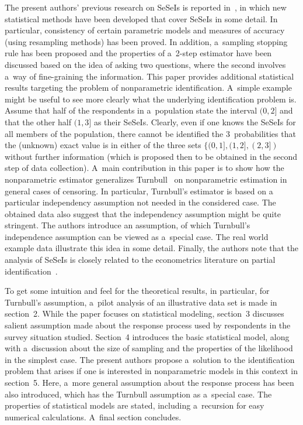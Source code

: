 \begin{multicols}{2}
The present authors' previous research on SeSeIs is reported in~\cite{BK:BK10, BK:BK12},
in which new statistical methods have been developed that cover SeSeIs in some detail. In particular,
consistency of certain parametric models and measures of accuracy (using resampling methods)
has been proved.
In addition, a~sampling stopping rule has been proposed
and the properties of a~2-step estimator have been discussed
based on the idea of asking two questions, where the second involves a~way of fine-graining the information.
This paper provides additional statistical results targeting the problem of nonparametric identification.
A~simple example might be useful to see more clearly what the underlying identification problem is.
Assume that half of the respondents in a~population state the interval $(0, 2]$ 
and that
the other half $(1, 3]$ as their SeSeIs. Clearly, even if one
 knows the SeSeIs for all members of
the population, there cannot be identified the 3~probabilities that the (unknown) exact value is in
either of the three sets $\{(0, 1],(1,2],(2,3])$ without further information (which 
is proposed
then to be obtained in the second step of data collection). A~main contribution in this paper is
to show how the nonparametric estimator generalizes Turnbull~\cite{BK:TU74, BK:TU76} on nonparametric
estimation in  general cases of censoring. In particular, Turnbull's estimator is based on a
particular independency assumption not needed in the considered case. 
The obtained data also suggest that the
independency assumption might be quite stringent. The authors introduce an assumption, of which
Turnbull's independence assumption can be viewed as a~special case. The
 real world example
data illustrate this idea in some detail. Finally, the authors note that the analysis of SeSeIs is
closely related to the econometrics literature on partial identification~\cite{BK:MA03}.

To get some intuition and feel for the theoretical results, in particular,
for Turnbull's assumption,
a~pilot analysis of an illustrative data set is made in section~2.
While the paper focuses on statistical modeling, section~3 discusses
salient assumption  made about the response process used by respondents in the survey
situation studied. Section~4 introduces the basic statistical model,
along with a~discussion about the size  of sampling and the properties of the likelihood in the simplest case.
The present authors propose a~solution  to the identification problem that arises if one
is  interested in nonparametric models in this context in section~5. Here,
a~more general assumption about the response process has been also introduced, 
which has the Turnbull assumption as
a~special case. The properties of statistical models are stated, including a~recursion for easy
numerical calculations. A~final section concludes.


\end{multicols}
